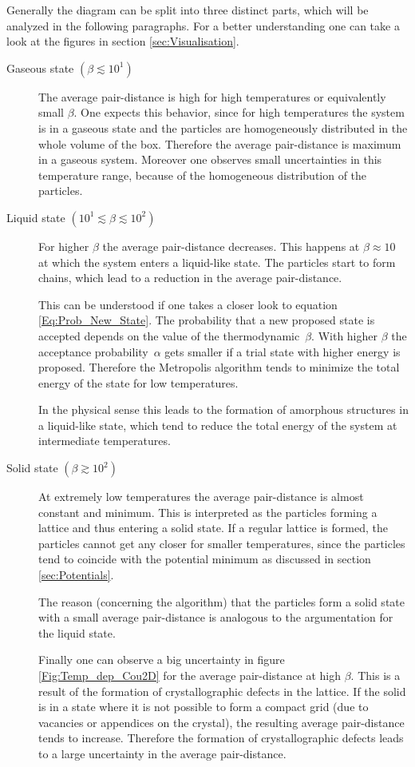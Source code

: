 \documentclass[11pt, a4paper]{article}
\numberwithin{equation}{section}
\begin{document}
Generally the diagram can be split into three distinct parts, which will be analyzed in the following paragraphs.
For a better understanding one can take a look at the figures in section \ref{sec:Visualisation}.
\begin{description}
	\item[Gaseous state $(\beta \lesssim 10^1)$] 
		The average pair-distance is high for high temperatures or equivalently small $\beta$.
		One expects this behavior, since for high temperatures the system is in a gaseous state and the particles are homogeneously distributed in the whole volume of the box.
		Therefore the average pair-distance is maximum in a gaseous system.
		Moreover one observes small uncertainties in this temperature range, because of the homogeneous distribution of the particles.
	
	\item[Liquid state $(10^1 \lesssim \beta \lesssim 10^2)$]
		For higher $\beta$ the average pair-distance decreases.
		This happens at $\beta \approx 10$ at which the system enters a liquid-like state.
		The particles start to form chains, which lead to a reduction in the average pair-distance.
		
		This can be understood if one takes a closer look to equation \ref{Eq:Prob_New_State}.
		The probability that a new proposed state is accepted depends on the value of the thermodynamic~$\beta$.
		With higher $\beta$ the acceptance probability~$\alpha$ gets smaller if a trial state with higher energy is proposed.
		Therefore the Metropolis algorithm tends to minimize the total energy of the state for low temperatures.
		
		In the physical sense this leads to the formation of amorphous structures in a liquid-like state, which tend to reduce the total energy of the system at intermediate temperatures.		
		
	\item[Solid state $(\beta \gtrsim 10^2)$]
		At extremely low temperatures the average pair-distance is almost constant and minimum.
		This is interpreted as the particles forming a lattice and thus entering a solid state.
		If a regular lattice is formed, the particles cannot get any closer for smaller temperatures, since the particles tend to coincide with the potential minimum as discussed in section \ref{sec:Potentials}.
		
		The reason (concerning the algorithm) that the particles form a solid state with a small average pair-distance is analogous to the argumentation for the liquid state.
		
		Finally one can observe a big uncertainty in figure \ref{Fig:Temp_dep_Cou2D} for the average pair-distance at high $\beta$.
		This is a result of the formation of crystallographic defects in the lattice.
		If the solid is in a state where it is not possible to form a compact grid (due to vacancies or appendices on the crystal), the resulting average pair-distance tends to increase.
		Therefore the formation of crystallographic defects leads to a large uncertainty in the average pair-distance.
\end{description}
\end{document}
